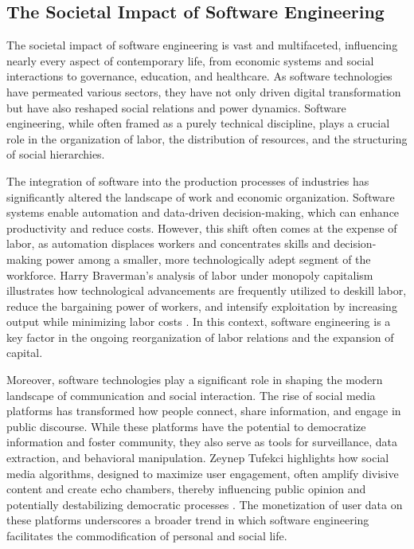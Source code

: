 \begin{refsection}
\section{The Societal Impact of Software Engineering}

The societal impact of software engineering is vast and multifaceted, influencing nearly every aspect of contemporary life, from economic systems and social interactions to governance, education, and healthcare. As software technologies have permeated various sectors, they have not only driven digital transformation but have also reshaped social relations and power dynamics. Software engineering, while often framed as a purely technical discipline, plays a crucial role in the organization of labor, the distribution of resources, and the structuring of social hierarchies.

The integration of software into the production processes of industries has significantly altered the landscape of work and economic organization. Software systems enable automation and data-driven decision-making, which can enhance productivity and reduce costs. However, this shift often comes at the expense of labor, as automation displaces workers and concentrates skills and decision-making power among a smaller, more technologically adept segment of the workforce. Harry Braverman’s analysis of labor under monopoly capitalism illustrates how technological advancements are frequently utilized to deskill labor, reduce the bargaining power of workers, and intensify exploitation by increasing output while minimizing labor costs \cite[pp.~53-57]{braverman1998labor}. In this context, software engineering is a key factor in the ongoing reorganization of labor relations and the expansion of capital.

Moreover, software technologies play a significant role in shaping the modern landscape of communication and social interaction. The rise of social media platforms has transformed how people connect, share information, and engage in public discourse. While these platforms have the potential to democratize information and foster community, they also serve as tools for surveillance, data extraction, and behavioral manipulation. Zeynep Tufekci highlights how social media algorithms, designed to maximize user engagement, often amplify divisive content and create echo chambers, thereby influencing public opinion and potentially destabilizing democratic processes \cite[pp.~150-153]{tufekci2021twitter}. The monetization of user data on these platforms underscores a broader trend in which software engineering facilitates the commodification of personal and social life.


\end{refsection}

